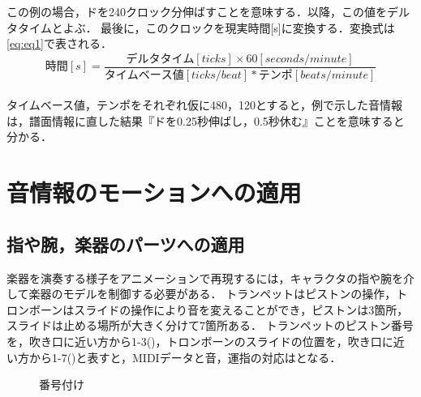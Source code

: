 この例の場合，ドを240クロック分伸ばすことを意味する．以降，この値をデルタタイムとよぶ．
最後に，このクロックを現実時間[s]に変換する．変換式は\eqref{eq:eq1}で表される．\\
\begin{equation}
\label{eq:eq1}
時間[s] = 
\frac {デルタタイム[ticks] × 60[seconds/minute]}{タイムベース値[ticks/beat] * テンポ[beats/minute]}
\end{equation}
\\
タイムベース値，テンポをそれぞれ仮に480，120とすると，例で示した音情報は，譜面情報に直した結果『ドを0.25秒伸ばし，0.5秒休む』ことを意味すると分かる．

\section{音情報のモーションへの適用} \label{adapt}
\subsection{指や腕，楽器のパーツへの適用}
楽器を演奏する様子をアニメーションで再現するには，キャラクタの指や腕を介して楽器のモデルを制御する必要がある．
トランペットはピストンの操作，トロンボーンはスライドの操作により音を変えることができ，ピストンは3箇所，スライドは止める場所が大きく分けて7箇所ある．
トランペットのピストン番号を，吹き口に近い方から1-3()，トロンボーンのスライドの位置を，吹き口に近い方から1-7()と表すと，MIDIデータと音，運指の対応はとなる．
\begin{figure}[h]
	\centering
	\caption{番号付け}
	\label{fig:numbering}
\end{figure}


